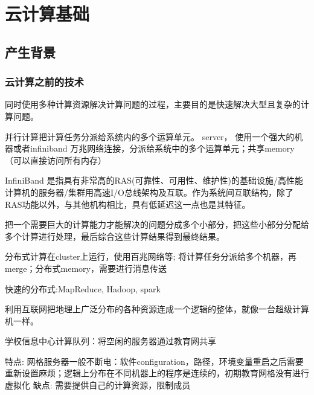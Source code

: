 \chapter{云计算基础}

\section{产生背景}

\subsection{云计算之前的技术}

\begin{definition}[并行计算]
    同时使用多种计算资源解决计算问题的过程，主要目的是快速解决大型且复杂的计算问题。

\end{definition}

并行计算把计算任务分派给系统内的多个运算单元。 server， 使用一个强大的机器或者infiniband 万兆网络连接，分派给系统中的多个运算单元；共享memory（可以直接访问所有内存）

\begin{definition}[InfiniBand]
    InfiniBand 是指具有非常高的RAS(可靠性、可用性、维护性)的基础设施/高性能计算机的服务器/集群用高速I/O总线架构及互联。作为系统间互联结构，除了RAS功能以外，与其他机构相比，具有低延迟这一点也是其特征。
\end{definition}

\begin{definition}[分布式计算]
    把一个需要巨大的计算能力才能解决的问题分成多个小部分，把这些小部分分配给多个计算进行处理，最后综合这些计算结果得到最终结果。
\end{definition}

分布式计算在cluster上运行，使用百兆网络等; 将计算任务分派给多个机器，再merge；分布式memory，需要进行消息传送

快速的分布式:MapReduce, Hadoop, spark

\begin{definition}[网格计算]
    利用互联网把地理上广泛分布的各种资源连成一个逻辑的整体，就像一台超级计算机一样。
\end{definition}

\begin{example}[教育网格]
    学校信息中心计算队列：将空闲的服务器通过教育网共享

    特点: 网格服务器一般不断电：软件configuration，路径，环境变量重启之后需要重新设置麻烦；逻辑上分布在不同机器上的程序是连续的，初期教育网格没有进行虚拟化
    缺点: 需要提供自己的计算资源，限制成员
\end{example}

